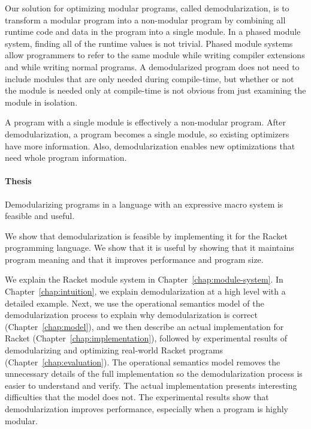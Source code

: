 Our solution for optimizing modular programs, called demodularization, is to transform a modular program into a non-modular program by combining all runtime code and data in the program into a single module.
In a phased module system, finding all of the runtime values is not trivial.
Phased module systems allow programmers to refer to the same module while writing compiler extensions and while writing normal programs.
A demodularized program does not need to include modules that are only needed during compile-time, but whether or not the module is needed only at compile-time is not obvious from just examining the module in isolation. 

A program with a single module is effectively a non-modular program. 
After demodularization, a program becomes a single module, so existing optimizers have more information. 
Also, demodularization enables new optimizations that need whole program information. 

\paragraph{Thesis} Demodularizing programs in a language with an expressive macro system is feasible and useful.

We show that demodularization is feasible by implementing it for the Racket programming language.
We show that it is useful by showing that it maintains program meaning and that it improves performance and program size.

We explain the Racket module system in Chapter~\ref{chap:module-system}. In Chapter~\ref{chap:intuition}, we explain demodularization at a high level with a detailed example.
Next, we use the operational semantics model of the demodularization process to explain why demodularization is correct (Chapter~\ref{chap:model}), and we then describe an actual implementation for Racket (Chapter~\ref{chap:implementation}), followed by experimental results of demodularizing and optimizing real-world Racket programs (Chapter~\ref{chap:evaluation}). 
The operational semantics model removes the unnecessary details of the full implementation so the demodularization process is easier to understand and verify. 
The actual implementation presents interesting difficulties that the model does not.
The experimental results show that demodularization improves performance, especially when a program is highly modular. 
